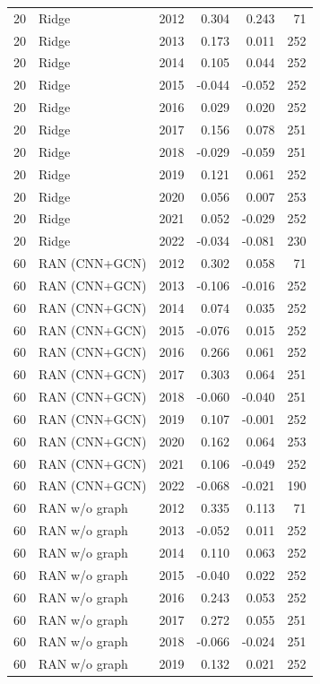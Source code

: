 \begin{table}[htbp]
{\begin{tabular}{llrrrr}
20 & Ridge & 2012 & 0.304 & 0.243 & 71 \\
20 & Ridge & 2013 & 0.173 & 0.011 & 252 \\
20 & Ridge & 2014 & 0.105 & 0.044 & 252 \\
20 & Ridge & 2015 & -0.044 & -0.052 & 252 \\
20 & Ridge & 2016 & 0.029 & 0.020 & 252 \\
20 & Ridge & 2017 & 0.156 & 0.078 & 251 \\
20 & Ridge & 2018 & -0.029 & -0.059 & 251 \\
20 & Ridge & 2019 & 0.121 & 0.061 & 252 \\
20 & Ridge & 2020 & 0.056 & 0.007 & 253 \\
20 & Ridge & 2021 & 0.052 & -0.029 & 252 \\
20 & Ridge & 2022 & -0.034 & -0.081 & 230 \\
60 & RAN (CNN+GCN) & 2012 & 0.302 & 0.058 & 71 \\
60 & RAN (CNN+GCN) & 2013 & -0.106 & -0.016 & 252 \\
60 & RAN (CNN+GCN) & 2014 & 0.074 & 0.035 & 252 \\
60 & RAN (CNN+GCN) & 2015 & -0.076 & 0.015 & 252 \\
60 & RAN (CNN+GCN) & 2016 & 0.266 & 0.061 & 252 \\
60 & RAN (CNN+GCN) & 2017 & 0.303 & 0.064 & 251 \\
60 & RAN (CNN+GCN) & 2018 & -0.060 & -0.040 & 251 \\
60 & RAN (CNN+GCN) & 2019 & 0.107 & -0.001 & 252 \\
60 & RAN (CNN+GCN) & 2020 & 0.162 & 0.064 & 253 \\
60 & RAN (CNN+GCN) & 2021 & 0.106 & -0.049 & 252 \\
60 & RAN (CNN+GCN) & 2022 & -0.068 & -0.021 & 190 \\
60 & RAN w/o graph & 2012 & 0.335 & 0.113 & 71 \\
60 & RAN w/o graph & 2013 & -0.052 & 0.011 & 252 \\
60 & RAN w/o graph & 2014 & 0.110 & 0.063 & 252 \\
60 & RAN w/o graph & 2015 & -0.040 & 0.022 & 252 \\
60 & RAN w/o graph & 2016 & 0.243 & 0.053 & 252 \\
60 & RAN w/o graph & 2017 & 0.272 & 0.055 & 251 \\
60 & RAN w/o graph & 2018 & -0.066 & -0.024 & 251 \\
60 & RAN w/o graph & 2019 & 0.132 & 0.021 & 252 \\

\end{tabular}}
\end{table}
